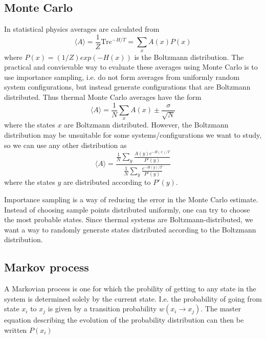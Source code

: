 \documentclass[a4paper]{article}
\newcommand{\trm}[1]{\textrm{#1}}
\begin{document}
\subsection{Monte Carlo}
In statistical physics averages are calculated from 
\begin{equation}
  \langle A\rangle = \frac{1}{Z}\trm{Tr} e^{-H/T} = \sum_x A(x) P(x)
  \label{}
\end{equation}
where  $P(x) = (1/Z)exp(-H(x))$ is the Boltzmann distribution.
The practical and convievable way to evaluate these averages using Monte Carlo is to use importance sampling, i.e. do not form averages from uniformly random system configurations, but instead generate configurations that are Boltzmann distributed.   
Thus thermal Monte Carlo averages have the form 
\begin{equation}
  \langle A \rangle = \frac{1}{N} \sum_x A(x) \pm \frac{\sigma	}{\sqrt N}
  \label{}
\end{equation}
where the states $x$ are Boltzmann distributed.
However, the Boltzmann distribution may be unsuitable for some systems/configurations we want to study, so we can use any other distribution as 
\begin{equation}
  \langle A \rangle = \frac{\frac{1}{N}\sum_y \frac{A(y) e^{-H(x)/T}}{P'(y)}}{\frac{1}{N}\sum_y \frac{e^{-H(y)/T}}{P'(y)}}  
  \label{}
\end{equation}
 where the states $y$ are distributed according to $P'(y)$.

 Importance sampling is a way of reducing the error in the Monte Carlo estimate. Instead of choosing sample points distributed uniformly, one can try to choose the most probable states. Since thermal systems are Boltzmann-distributed, we want a way to randomly generate states distributed according to the Boltzmann distribution.
\subsection{Markov process}
A Markovian process is one for which the probility of getting to any state in the system is determined solely by the current state. I.e. the probability of going from state $x_i$ to $x_{j}$ is given by a transition probability $w(x_i \rightarrow x_j)$. The master equation describing the evolution of the probability distribution can then be written $P(x_i )$
 
\end{document}
